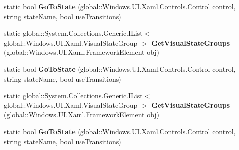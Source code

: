 \begin{DoxyCompactItemize}
static bool {\bfseries Go\+To\+State} (global\+::\+Windows.\+U\+I.\+Xaml.\+Controls.\+Control control, string state\+Name, bool use\+Transitions)
\item 
\mbox{\label{class_windows_1_1_u_i_1_1_xaml_1_1_visual_state_manager_a350961a3e264abb0e6a192dee36c3c2d}} 
static global\+::\+System.\+Collections.\+Generic.\+I\+List$<$ global\+::\+Windows.\+U\+I.\+Xaml.\+Visual\+State\+Group $>$ {\bfseries Get\+Visual\+State\+Groups} (global\+::\+Windows.\+U\+I.\+Xaml.\+Framework\+Element obj)
\item 
\mbox{\label{class_windows_1_1_u_i_1_1_xaml_1_1_visual_state_manager_a5e1fb7fe58054bc7166b1f7cb0656de4}} 
static bool {\bfseries Go\+To\+State} (global\+::\+Windows.\+U\+I.\+Xaml.\+Controls.\+Control control, string state\+Name, bool use\+Transitions)
\item 
\mbox{\label{class_windows_1_1_u_i_1_1_xaml_1_1_visual_state_manager_a350961a3e264abb0e6a192dee36c3c2d}} 
static global\+::\+System.\+Collections.\+Generic.\+I\+List$<$ global\+::\+Windows.\+U\+I.\+Xaml.\+Visual\+State\+Group $>$ {\bfseries Get\+Visual\+State\+Groups} (global\+::\+Windows.\+U\+I.\+Xaml.\+Framework\+Element obj)
\item 
\mbox{\label{class_windows_1_1_u_i_1_1_xaml_1_1_visual_state_manager_a5e1fb7fe58054bc7166b1f7cb0656de4}} 
static bool {\bfseries Go\+To\+State} (global\+::\+Windows.\+U\+I.\+Xaml.\+Controls.\+Control control, string state\+Name, bool use\+Transitions)
\end{DoxyCompactItemize}
